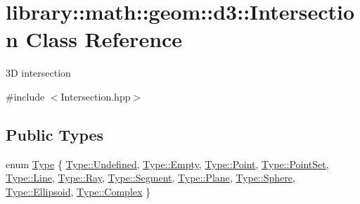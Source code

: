 \hypertarget{classlibrary_1_1math_1_1geom_1_1d3_1_1_intersection}{}\section{library\+:\+:math\+:\+:geom\+:\+:d3\+:\+:Intersection Class Reference}
\label{classlibrary_1_1math_1_1geom_1_1d3_1_1_intersection}


3D intersection  




{\ttfamily \#include $<$Intersection.\+hpp$>$}

\subsection*{Public Types}
\begin{DoxyCompactItemize}
\item 
enum \hyperlink{classlibrary_1_1math_1_1geom_1_1d3_1_1_intersection_a3465d607fd42380f350598e055271b05}{Type} \{ \newline
\hyperlink{classlibrary_1_1math_1_1geom_1_1d3_1_1_intersection_a3465d607fd42380f350598e055271b05aec0fc0100c4fc1ce4eea230c3dc10360}{Type\+::\+Undefined}, 
\hyperlink{classlibrary_1_1math_1_1geom_1_1d3_1_1_intersection_a3465d607fd42380f350598e055271b05ace2c8aed9c2fa0cfbed56cbda4d8bf07}{Type\+::\+Empty}, 
\hyperlink{classlibrary_1_1math_1_1geom_1_1d3_1_1_intersection_a3465d607fd42380f350598e055271b05a2a3cd5946cfd317eb99c3d32e35e2d4c}{Type\+::\+Point}, 
\hyperlink{classlibrary_1_1math_1_1geom_1_1d3_1_1_intersection_a3465d607fd42380f350598e055271b05aaedf8f48dfa5b704b6c12b415707a1da}{Type\+::\+Point\+Set}, 
\newline
\hyperlink{classlibrary_1_1math_1_1geom_1_1d3_1_1_intersection_a3465d607fd42380f350598e055271b05a4803e6b9e63dabf04de980788d6a13c4}{Type\+::\+Line}, 
\hyperlink{classlibrary_1_1math_1_1geom_1_1d3_1_1_intersection_a3465d607fd42380f350598e055271b05a9406e3c325bfc9873426e5eda4ba6e18}{Type\+::\+Ray}, 
\hyperlink{classlibrary_1_1math_1_1geom_1_1d3_1_1_intersection_a3465d607fd42380f350598e055271b05a4b77e2a9d8e9cfc299f504b32d6e3d2b}{Type\+::\+Segment}, 
\hyperlink{classlibrary_1_1math_1_1geom_1_1d3_1_1_intersection_a3465d607fd42380f350598e055271b05a0d3adee051531c15b3509b4d4d75ce7b}{Type\+::\+Plane}, 
\newline
\hyperlink{classlibrary_1_1math_1_1geom_1_1d3_1_1_intersection_a3465d607fd42380f350598e055271b05ab7095f057db3fefa7325ad93a04e14fd}{Type\+::\+Sphere}, 
\hyperlink{classlibrary_1_1math_1_1geom_1_1d3_1_1_intersection_a3465d607fd42380f350598e055271b05aeee5397cecd880d16ef7244819aa383d}{Type\+::\+Ellipsoid}, 
\hyperlink{classlibrary_1_1math_1_1geom_1_1d3_1_1_intersection_a3465d607fd42380f350598e055271b05a10b4eb76294b70d7fd6df997ff06edb1}{Type\+::\+Complex}
 \}
\end{DoxyCompactItemize}
